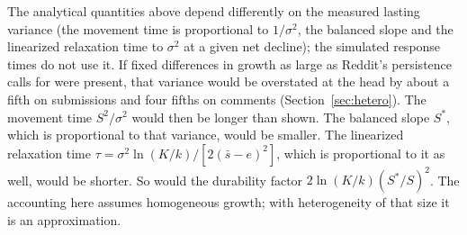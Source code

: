 \documentclass[10pt]{article}
\begin{document}
The analytical quantities above depend differently on the measured lasting variance (the movement time is proportional to $1/\sigma^2$, the balanced slope and the linearized relaxation time to $\sigma^2$ at a given net decline); the simulated response times do not use it. If fixed differences in growth as large as Reddit's persistence calls for were present, that variance would be overstated at the head by about a fifth on submissions and four fifths on comments (Section~\ref{sec:hetero}). The movement time $S^2/\sigma^2$ would then be longer than shown. The balanced slope $S^\ast$, which is proportional to that variance, would be smaller. The linearized relaxation time $\tau = \sigma^2\ln(K/k)/[2(\bar s-e)^2]$, which is proportional to it as well, would be shorter. So would the durability factor $2\ln(K/k)(S^\ast/S)^2$. The accounting here assumes homogeneous growth; with heterogeneity of that size it is an approximation.
\end{document}
